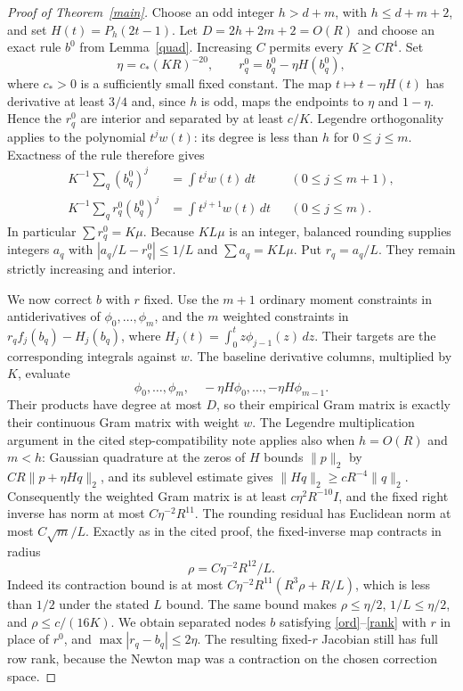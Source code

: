 \documentclass[11pt]{article}
\begin{document}
\begin{proof}[Proof of Theorem~\ref{main}]
Choose an odd integer $h>d+m$, with $h\le d+m+2$, and set
$H(t)=P_h(2t-1)$. Let $D=2h+2m+2=O(R)$ and choose an exact rule
$b^0$ from Lemma~\ref{quad}. Increasing $C$ permits every $K\ge CR^4$.
Set
\[
 \eta=c_*(KR)^{-20},\qquad r_q^0=b_q^0-\eta H(b_q^0),
\]
where $c_*>0$ is a sufficiently small fixed constant.
The map $t\mapsto t-\eta H(t)$ has derivative at least $3/4$ and,
since $h$ is odd, maps the endpoints to $\eta$ and $1-\eta$.
Hence the $r_q^0$ are interior and separated by at least $c/K$.
Legendre orthogonality applies to the polynomial $t^j w(t)$:
its degree is less than $h$ for $0\le j\le m$. Exactness of the rule
therefore gives
\begin{align}
 K^{-1}\sum_q(b_q^0)^j&=\int t^j w(t)\,dt &&(0\le j\le m+1),\label{ord}\\
 K^{-1}\sum_q r_q^0(b_q^0)^j&=\int t^{j+1}w(t)\,dt &&(0\le j\le m).\label{rank}
\end{align}
In particular $\sum r_q^0=K\mu$.
Because $KL\mu$ is an integer, balanced rounding supplies integers
$a_q$ with $|a_q/L-r_q^0|\le1/L$ and $\sum a_q=KL\mu$.
Put $r_q=a_q/L$. They remain strictly increasing and interior.

We now correct $b$ with $r$ fixed. Use the $m+1$ ordinary moment
constraints in antiderivatives of $\phi_0,\ldots,\phi_m$, and the $m$
weighted constraints in $r_q f_j(b_q)-H_j(b_q)$, where
$H_j(t)=\int_0^t z\phi_{j-1}(z)\,dz$.
Their targets are the corresponding integrals against $w$.
The baseline derivative columns, multiplied by $K$, evaluate
\[
 \phi_0,\ldots,\phi_m,\quad
 -\eta H\phi_0,\ldots,-\eta H\phi_{m-1}.
\]
Their products have degree at most $D$, so their empirical Gram matrix
is exactly their continuous Gram matrix with weight $w$.
The Legendre multiplication argument in the cited step-compatibility
note applies also when $h=O(R)$ and $m<h$: Gaussian quadrature at the
zeros of $H$ bounds $\|p\|_2$ by $CR\|p+\eta Hq\|_2$, and its
sublevel estimate gives $\|Hq\|_2\ge cR^{-4}\|q\|_2$.
Consequently the weighted Gram matrix is at least
$c\eta^2R^{-10}I$, and the fixed right inverse has norm at most
$C\eta^{-2}R^{11}$.
The rounding residual has Euclidean norm at most $C\sqrt m/L$.
Exactly as in the cited proof, the fixed-inverse map contracts in
radius
\[
 \rho=C\eta^{-2}R^{12}/L.
\]
Indeed its contraction bound is at most
$C\eta^{-2}R^{11}(R^3\rho+R/L)$, which is less than $1/2$ under
the stated $L$ bound. The same bound makes $\rho\le\eta/2$, $1/L\le\eta/2$, and
$\rho\le c/(16K)$. We obtain separated nodes $b$ satisfying
\eqref{ord}--\eqref{rank} with $r$ in place of $r^0$, and
$\max|r_q-b_q|\le2\eta$.
The resulting fixed-$r$ Jacobian still has full row rank, because the
Newton map was a contraction on the chosen correction space.


\end{proof}
\end{document}
